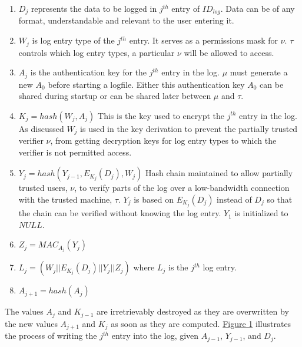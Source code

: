 \documentclass[12pt, letter]{article}
\begin{document}
\begin{enumerate}
\label{sec:rules}
    \item $D_j$ represents the data to be logged in $j^{th}$ entry of $ID_{log}$. Data can be of any format, understandable and relevant to the user entering it. 
    
    \item $W_j$ is log entry type of the $j^{th}$ entry. It serves as a permissions mask for $\nu$. $\tau$ controls which log entry types, a particular $\nu$ will be allowed to access.
    
    \item  $A_j$ is the authentication key for the $j^{th}$ entry in the log. $\mu$ must generate a new $A_0$ before starting a logfile. Either this authentication key $A_0$ can be shared during startup or can be shared later between $\mu$ and $\tau$.
    
    \item $K_j = hash(W_j, A_j)$ This is the key used to encrypt the $j^{th}$ entry in the log. As discussed $W_j$ is used in the key derivation to prevent the partially trusted verifier $\nu$, from getting decryption keys for log entry types to which the verifier is not permitted access.
    
    \item $Y_j = hash(Y_{j-1}, E_{K_j}(D_j), W_j)$ Hash chain maintained to allow partially trusted users, $\nu$, to verify parts of the log over a low-bandwidth connection with the trusted machine, $\tau$. $Y_j$ is based on $E_{K_j}(D_j)$ instead of $D_j$ so that the chain can be verified without knowing the log entry. $Y_1$ is initialized to $NULL$. 
    
    \item $Z_j = MAC_{A_j}(Y_j)$
    
    \item $L_j = (W_j || E_{K_j}(D_j) || Y_j || Z_j)$ where $L_j$ is the $j^{th}$ log entry. 
    
    \item $A_{j+1} = hash(A_j)$
    
\end{enumerate}

The values $A_j$ and $K_{j-1}$ are irretrievably destroyed as they are overwritten by the new values $A_{j+1}$ and $K_j$ as soon as they are computed.  \hyperref[fig:architecture]{Figure 1} illustrates the process of writing the $j^{th}$ entry into the log, given $A_{j-1}$, $Y_{j-1}$, and $D_j$.\\
\end{document}
